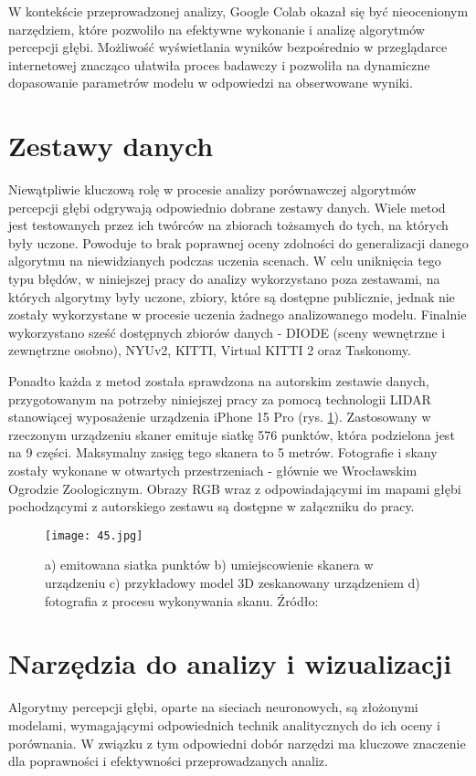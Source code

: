 W kontekście przeprowadzonej analizy, Google Colab okazał się być nieocenionym narzędziem, które pozwoliło na efektywne wykonanie i analizę algorytmów percepcji głębi. Możliwość wyświetlania wyników bezpośrednio w przeglądarce internetowej znacząco ułatwiła proces badawczy i pozwoliła na dynamiczne dopasowanie parametrów modelu w odpowiedzi na obserwowane wyniki.

\section{Zestawy danych}
Niewątpliwie kluczową rolę w procesie analizy porównawczej algorytmów percepcji głębi odgrywają odpowiednio dobrane zestawy danych. Wiele metod jest testowanych przez ich twórców na zbiorach tożsamych do tych, na których były uczone. Powoduje to brak poprawnej oceny zdolności do generalizacji danego algorytmu na niewidzianych podczas uczenia scenach. W celu uniknięcia tego typu błędów, w niniejszej pracy do analizy wykorzystano poza zestawami, na których algorytmy były uczone, zbiory, które są dostępne publicznie, jednak nie zostały wykorzystane w procesie uczenia żadnego analizowanego modelu. Finalnie wykorzystano sześć dostępnych zbiorów danych - DIODE (sceny wewnętrzne i zewnętrzne osobno), NYUv2, KITTI, Virtual KITTI 2 oraz Taskonomy.

Ponadto każda z metod została sprawdzona na autorskim zestawie danych, przygotowanym na potrzeby niniejszej pracy za pomocą technologii LIDAR stanowiącej wyposażenie urządzenia iPhone 15 Pro \cite{chase2022apple} (rys. \ref{fig:iphone-lidar}). Zastosowany w rzeczonym urządzeniu skaner emituje siatkę 576 punktów, która podzielona jest na 9 części. Maksymalny zasięg tego skanera to 5 metrów. Fotografie i skany zostały wykonane w otwartych przestrzeniach - głównie we Wrocławskim Ogrodzie Zoologicznym. Obrazy RGB wraz z odpowiadającymi im mapami głębi pochodzącymi z autorskiego zestawu są dostępne w załączniku do pracy.
\begin{figure}[H]
    \centering
    \texttt{[image: 45.jpg]}
    \caption{a) emitowana siatka punktów b) umiejscowienie skanera w urządzeniu c) przykładowy model 3D zeskanowany urządzeniem d) fotografia z procesu wykonywania skanu. Źródło: \cite{luetzenburg2021evaluation}}
    \label{fig:iphone-lidar}
\end{figure}

\section{Narzędzia do analizy i wizualizacji}
Algorytmy percepcji głębi, oparte na sieciach neuronowych, są złożonymi modelami, wymagającymi odpowiednich technik analitycznych do ich oceny i porównania. W związku z tym odpowiedni dobór narzędzi ma kluczowe znaczenie dla poprawności i efektywności przeprowadzanych analiz.

